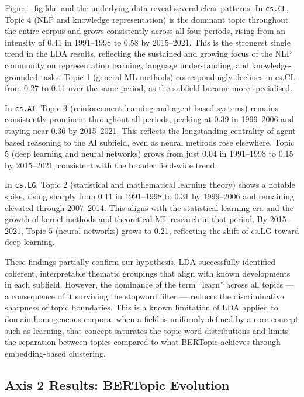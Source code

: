 \documentclass{article}
\begin{document}
Figure~\ref{fig:lda} and the underlying data reveal several
clear patterns. In \texttt{cs.CL}, Topic 4 (NLP and
knowledge representation) is the dominant topic throughout
the entire corpus and grows consistently across all four
periods, rising from an intensity of 0.41 in 1991--1998 to
0.58 by 2015--2021. This is the strongest single trend in
the LDA results, reflecting the sustained and growing focus
of the NLP community on representation learning, language
understanding, and knowledge-grounded tasks. Topic 1
(general ML methods) correspondingly declines in cs.CL
from 0.27 to 0.11 over the same period, as the subfield
became more specialised.

In \texttt{cs.AI}, Topic 3 (reinforcement learning and
agent-based systems) remains consistently prominent
throughout all periods, peaking at 0.39 in 1999--2006 and
staying near 0.36 by 2015--2021. This reflects the
longstanding centrality of agent-based reasoning to the AI
subfield, even as neural methods rose elsewhere. Topic 5
(deep learning and neural networks) grows from just 0.04 in
1991--1998 to 0.15 by 2015--2021, consistent with the
broader field-wide trend.

In \texttt{cs.LG}, Topic 2 (statistical and mathematical
learning theory) shows a notable spike, rising sharply from
0.11 in 1991--1998 to 0.31 by 1999--2006 and remaining
elevated through 2007--2014. This aligns with the statistical
learning era and the growth of kernel methods and
theoretical ML research in that period. By 2015--2021,
Topic 5 (neural networks) grows to 0.21, reflecting
the shift of cs.LG toward deep learning.

These findings partially confirm our hypothesis. LDA
successfully identified coherent, interpretable thematic
groupings that align with known developments in each
subfield. However, the dominance of the term ``learn''
across all topics — a consequence of it surviving the
stopword filter — reduces the discriminative sharpness of
topic boundaries. This is a known limitation of LDA applied
to domain-homogeneous corpora: when a field is uniformly
defined by a core concept such as learning, that concept
saturates the topic-word distributions and limits the
separation between topics compared to what BERTopic
achieves through embedding-based clustering.

\subsection{Axis 2 Results: BERTopic Evolution}
\end{document}
